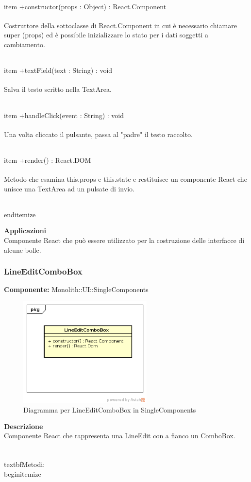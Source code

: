 \\item +constructor(props : Object) : React.Component 
\\\\
Costruttore della sottoclasse di React.Component in cui è necessario chiamare super (props) ed è possibile inizializzare lo stato per i dati soggetti a cambiamento.

\\item +textField(text : String) : void 
\\\\
Salva il testo scritto nella TextArea.

\\item +handleClick(event : String) : void  
\\\\
Una volta cliccato il pulsante, passa al "padre" il testo raccolto. 

\\item +render() : React.DOM 
\\\\
Metodo che esamina this.props e this.state e restituisce un componente React che unisce una TextArea ad un pulsate di invio.

\\end{itemize} 


\textbf{Applicazioni}\\
Componente React che può essere utilizzato per la costruzione delle interfacce di alcune bolle. 


\clearpage

\subsubsection{LineEditComboBox}
\textbf{Componente:}  Monolith::UI::SingleComponents\\
   \FloatBarrier
   \begin{figure}[ht]
   \centering
   \includegraphics[width=0.6\textwidth]{img/single-LineEditComboBox}
   \caption{{Diagramma per LineEditComboBox in SingleComponents}}
\end{figure}
\FloatBarrier
\textbf{Descrizione}\\
Componente React che rappresenta una LineEdit con a fianco un ComboBox. \\\\
\\textbf{Metodi:} 
\\begin{itemize}


